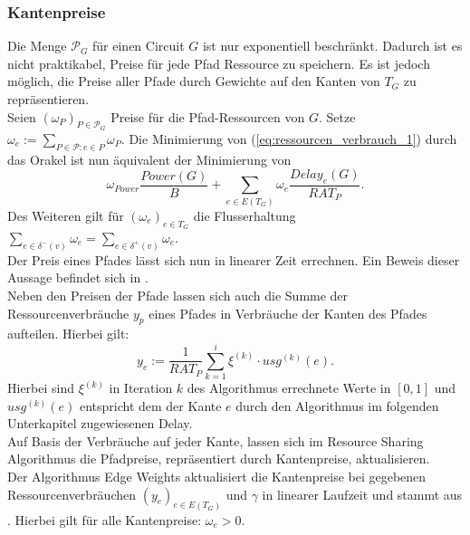 \documentclass[11pt, a4paper, german]{article}
\begin{document}
\subsubsection{Kantenpreise}\label{subsubsec:kantenpreise}
Die Menge $\mathcal{P}_G$ für einen Circuit $G$ ist nur exponentiell beschränkt. Dadurch ist es nicht praktikabel, Preise für jede Pfad Ressource zu speichern. Es ist jedoch möglich, die Preise aller Pfade durch Gewichte auf den Kanten von $T_G$ zu repräsentieren. \\
Seien $(\omega _P)_{P \in \mathcal{P}_G}$ Preise für die Pfad-Ressourcen von $G$. Setze $\omega _e := \sum\limits_{P \in \mathcal{P} : e \in P} \omega _P$.  Die Minimierung von (\ref{eq:ressourcen_verbrauch_1}) durch das Orakel ist nun äquivalent der Minimierung von 
\begin{equation}\label{eq:ressourcen_verbrauch_2}
\omega _{Power} \frac{Power(G)}{B} + \sum\limits_{e \in E(T_G)} \omega_e \frac{Delay_e(G)}{RAT_P}.
\end{equation}
Des Weiteren gilt für $(\omega_e)_{e \in T_G}$ die Flusserhaltung $\sum_{e \in  \delta^- (v)} \omega_e = \sum_{e \in  \delta^+ (v)} \omega_e $.\\

Der Preis eines Pfades lässt sich nun in linearer Zeit errechnen. Ein Beweis dieser Aussage befindet sich in \cite{Haehnle2015}.\\
Neben den Preisen der Pfade lassen sich auch die Summe der Ressourcenverbräuche $y_p$ eines Pfades in Verbräuche der Kanten des Pfades aufteilen. Hierbei gilt: 
\[y_e := \frac{1}{RAT_P} \sum\limits_{k=1}^i \xi^{(k)} \cdot usg^{(k)}(e).\]
Hierbei sind $\xi^{(k)}$ in Iteration $k$ des Algorithmus errechnete Werte in $[0,1]$ und $usg^{(k)}(e)$ entspricht dem der Kante $e$ durch den Algorithmus im folgenden Unterkapitel zugewiesenen Delay.\\
Auf Basis der Verbräuche auf jeder Kante, lassen sich im Resource Sharing Algorithmus die Pfadpreise, repräsentiert durch Kantenpreise,  aktualisieren. \\

Der Algorithmus Edge Weights aktualisiert die Kantenpreise bei gegebenen Ressourcenverbräuchen $(y_e)_{e\in E(T_G)}$ und $\gamma$ in linearer Laufzeit und stammt aus \cite{Daboul2018}. Hierbei gilt für alle Kantenpreise: $\omega_e > 0$. \\
\end{document}
